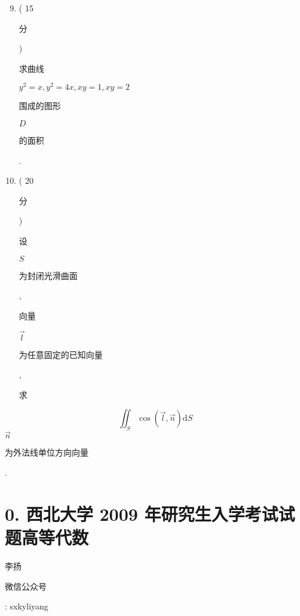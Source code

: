 \documentclass[10pt]{article}
\begin{document}
\begin{enumerate}
  \setcounter{enumi}{8}
  \item ( 15 \begin{CJK}{UTF8}{mj}分\end{CJK}) \begin{CJK}{UTF8}{mj}求曲线\end{CJK} $y^{2}=x, y^{2}=4 x, x y=1, x y=2$ \begin{CJK}{UTF8}{mj}围成的图形\end{CJK} $D$ \begin{CJK}{UTF8}{mj}的面积\end{CJK}.

  \item ( 20 \begin{CJK}{UTF8}{mj}分\end{CJK}) \begin{CJK}{UTF8}{mj}设\end{CJK} $S$ \begin{CJK}{UTF8}{mj}为封闭光滑曲面\end{CJK}, \begin{CJK}{UTF8}{mj}向量\end{CJK} $\vec{l}$ \begin{CJK}{UTF8}{mj}为任意固定的已知向量\end{CJK}, \begin{CJK}{UTF8}{mj}求\end{CJK}

\end{enumerate}
$$
\iint_{S} \cos (\vec{l}, \vec{n}) \mathrm{d} S
$$
$\vec{n}$ \begin{CJK}{UTF8}{mj}为外法线单位方向向量\end{CJK}.

\section{0. 西北大学 2009 年研究生入学考试试题高等代数}
\begin{CJK}{UTF8}{mj}李扬\end{CJK}

\begin{CJK}{UTF8}{mj}微信公众号\end{CJK}: sxkyliyang
\end{document}
